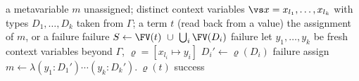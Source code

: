 \begin{algorithm}[t]
\caption{\Solve$(m,\vs x,t)$: assign the pattern $\meta m\,\vs x \conv t$ in a context $\Gamma$ of size $n$}
\label{alg:solve}
\begin{algorithmic}[1]
\Require a metavariable $m$ unassigned; distinct context variables $\vs x = x_{l_1},\dots,x_{l_k}$ with types $D_1,\dots,D_k$ taken from $\Gamma$; a term $t$ (read back from a value)
\Ensure the assignment of $m$, or a failure
 \Return failure 
\EndIf
\State $S \gets \FV(t)\ \cup\ \bigcup_{i}\FV(D_i)$
 \Return failure 
\EndIf
\State let $y_1,\dots,y_k$ be fresh context variables beyond $\Gamma$, $\varrho = [x_{l_i}\mapsto y_i]$
   \State $D_i' \gets \varrho(D_i)$
    \Return failure 
   \EndIf
\EndFor
\State assign $m \gets \lambda(y_1{:}D_1')\cdots(y_k{:}D_k').\ \varrho(t)$ 
\State \Return success
\end{algorithmic}
\end{algorithm}

